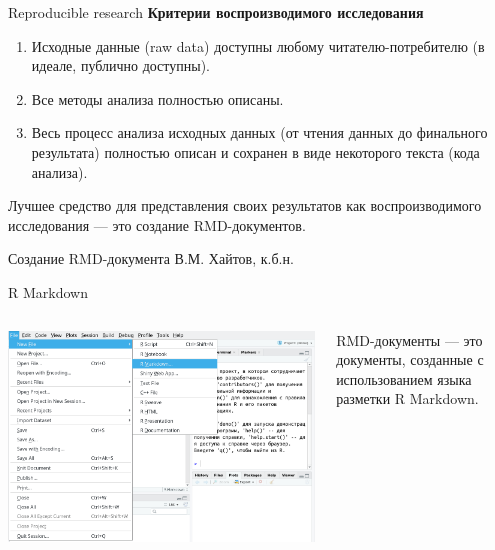 \documentclass[
  10pt,
  ignorenonframetext,
  aspectratio=169,t,xcolor=table]{beamer}
\newcommand{\columnsbegin}{\vspace{-0.5\baselineskip}\begin{columns}[t,onlytextwidth]}
\newcommand{\columnsend}{\end{columns}}
\begin{document}
\begin{frame}{Reproducible research}
\protect\hypertarget{reproducible-research-1}{}
\textbf{Критерии воспроизводимого исследования}

\begin{enumerate}
  \item Исходные данные (raw data) доступны любому читателю-потребителю (в идеале, публично доступны).
  \item Все методы анализа полностью описаны.
  \item Весь процесс анализа исходных данных (от чтения данных до финального результата) полностью описан и сохранен в виде некоторого текста (кода анализа).

\end{enumerate}

\centering

Лучшее средство для представления своих результатов как воспроизводимого
исследования --- это создание RMD-документов.
\end{frame}

\begin{frame}{Создание RMD-документа}
\protect\hypertarget{ux441ux43eux437ux434ux430ux43dux438ux435-rmd-ux434ux43eux43aux443ux43cux435ux43dux442ux430}{}
В.М. Хайтов, к.б.н.

\insertinstitute
\end{frame}

\begin{frame}{R Markdown}
\protect\hypertarget{r-markdown}{}
\columnsbegin
{}

\includegraphics[height=0.7\textheight,keepaspectratio]{./images/RMD_step_1_Ira.png}


RMD-документы --- это документы, созданные с использованием языка
разметки R Markdown.

\columnsend
\end{frame}
\end{document}
